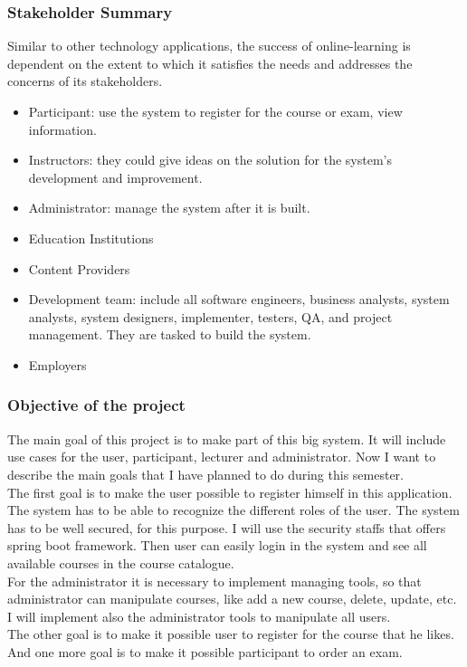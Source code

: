 \documentclass{scrartcl}
\begin{document}
  	\subsubsection{Stakeholder Summary}
  	Similar to other technology applications, the success of online-learning is dependent on the extent to which it satisfies the needs and addresses the concerns of its stakeholders.
  	\begin{itemize}
  	\item Participant: use the system to register for the course or exam, view 			information.
  	\item Instructors: they could give ideas on the solution for the system’s development and improvement.
  	\item Administrator: manage the system after it is built.
  	\item Education Institutions 
  	\item Content Providers
  	\item Development team: include all software engineers, business analysts, system analysts, system designers, implementer, testers, QA, and project management. They are tasked to build the system.
  	\item Employers
  	\end{itemize}
  	
  	\subsubsection{Objective of the project}
  	The main goal of this project is to make part of this big system. It will include use cases for the user, participant, lecturer and administrator. 
  Now I want to describe the main goals that I have planned to do during this semester. \\The first goal is to make the user possible to register himself in this application. The system has to be able to recognize the different roles of the user. The system has to be well secured, for this purpose. I will use the security staffs that offers spring boot framework. Then user can easily login in the system and see all available courses in the course catalogue. \\
  For the administrator it is necessary to implement managing tools, so that administrator can manipulate courses, like add a new course, delete, update, etc. I will implement also the administrator tools to manipulate all users.\\
  The other goal is to make it possible user to register for the course that he likes. And one more goal is to make it possible participant to order an exam. 
  
\end{document}
